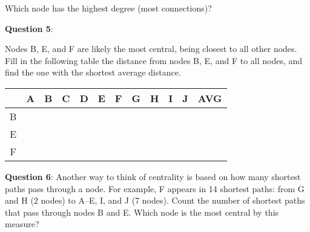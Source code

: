 \documentclass[a4paper, 14pt]{extarticle}
\begin{document}
\begin{center}
\end{center}

Which node has the highest degree (most connections)?


{\bf Question 5}:

Nodes B, E, and F are likely the most central, being closest to all other nodes. Fill in the following table the distance from nodes B, E, and F to all nodes, and find the one with the shortest average distance.

\begin{center}
\begin{tabular}{|c|p{1cm}|p{1cm}|p{1cm}|p{1cm}|p{1cm}|p{1cm}|p{1cm}|p{1cm}|p{1cm}|p{1cm}|p{1cm}|}
\hline
& A & B & C & D & E & F & G & H & I & J & AVG \\
\hline
B & & & & & & & & & & & \\[0.5cm]
\hline
E & & & & & & & & & & & \\[0.5cm]
\hline
F & & & & & & & & & & & \\[0.5cm]
\hline
\end{tabular}
\end{center}

\clearpage

{\bf Question 6}:
Another way to think of centrality is based on how many shortest paths pass through a node.
For example, F appears in 14 shortest paths: from G and H (2 nodes) to A--E, I, and J (7 nodes).
Count the number of shortest paths that pass through nodes B and E. Which node is the most central by this measure?
\end{document}
